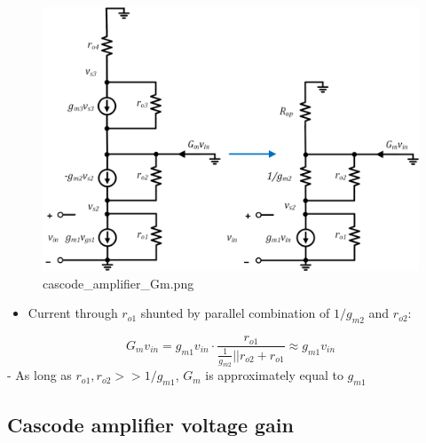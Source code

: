 \documentclass[11pt]{article}
\providecommand{\tightlist}{%
      \setlength{\itemsep}{0pt}\setlength{\parskip}{0pt}}
\begin{document}
    \begin{figure}
\centering
\includegraphics{cascode_amplifier_Gm.png}
\caption{cascode\_amplifier\_Gm.png}
\end{figure}

    \begin{itemize}
\tightlist
\item
  Current through \(r_{o1}\) shunted by parallel combination of
  \(1/g_{m2}\) and \(r_{o2}\):
\end{itemize}

\begin{equation}
G_m v_{in} = g_{m1}v_{in}\cdot\dfrac{r_{o1}}{\frac{1}{g_{m2}}||r_{o2} + r_{o1}} \approx g_{m1}v_{in}
\end{equation} - As long as \(r_{o1},r_{o2} >> 1/g_{m1}\), \(G_m\) is
approximately equal to \(g_{m1}\)

    \hypertarget{cascode-amplifier-voltage-gain}{%
\subsection{Cascode amplifier voltage
gain}\label{cascode-amplifier-voltage-gain}}
\end{document}
